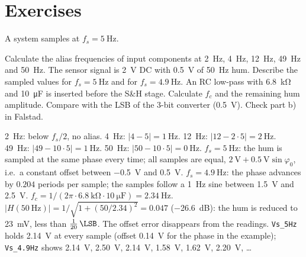 \section{Exercises}

\label{ex:adc-alias}
A system samples at $f_s = \SI{5}{\hertz}$.
\begin{talist}
\ta Calculate the alias frequencies of input components at \SI{2}{\hertz},
	\SI{4}{\hertz}, \SI{12}{\hertz}, \SI{49}{\hertz} and \SI{50}{\hertz}.
\ta The sensor signal is \SI{2}{\volt} DC with \SI{0.5}{\volt} of \SI{50}{\hertz} hum.
	Describe the sampled values for $f_s = \SI{5}{\hertz}$ and for $f_s = \SI{4.9}{\hertz}$.
\ta An RC low-pass with \SI{6.8}{\kilo\ohm} and \SI{10}{\micro\farad} is inserted before the S\&H stage.
	Calculate $f_c$ and the remaining hum amplitude. Compare with the LSB of
	the 3-bit converter (\SI{0.5}{\volt}).
\ta Check part b) in Falstad.
\end{talist}

\begin{solution}
\begin{talist}
\ta \SI{2}{\hertz}: below $f_s/2$, no alias. \SI{4}{\hertz}: $|4-5| = \SI{1}{\hertz}$.
	\SI{12}{\hertz}: $|12-2\cdot5| = \SI{2}{\hertz}$. \SI{49}{\hertz}: $|49-10\cdot5| = \SI{1}{\hertz}$.
	\SI{50}{\hertz}: $|50-10\cdot5| = \SI{0}{\hertz}$.
\ta $f_s = \SI{5}{\hertz}$: the hum is sampled at the same phase every time; all samples
	are equal, $\SI{2}{\volt} + \SI{0.5}{\volt}\sin\varphi_0$, i.e.\ a constant offset between
	\SI{-0.5}{\volt} and \SI{+0.5}{\volt}. $f_s = \SI{4.9}{\hertz}$: the phase advances by
	$0.204$ periods per sample; the samples follow a \SI{1}{\hertz} sine between \SI{1.5}{\volt}
	and \SI{2.5}{\volt}.
\ta $f_c = 1/(2\pi\cdot\SI{6.8}{\kilo\ohm}\cdot\SI{10}{\micro\farad}) = \SI{2.34}{\hertz}$.
	$|H(\SI{50}{\hertz})| = 1/\sqrt{1+(50/2.34)^2} = 0.047$ (\SI{-26.6}{\dB}): the hum is reduced to
	\SI{23}{\milli\volt}, less than $\frac{1}{20}\,\LSB$. The offset error disappears from the readings.
\ta {}\newline \texttt{Vs\_5Hz} holds \SI{2.14}{\volt} at every sample (offset
	\SI{0.14}{\volt} for the phase in the example); \texttt{Vs\_4.9Hz} shows \SI{2.14}{\volt},
	\SI{2.50}{\volt}, \SI{2.14}{\volt}, \SI{1.58}{\volt}, \SI{1.62}{\volt}, \SI{2.20}{\volt}, \ldots
\end{talist}
\end{solution}

